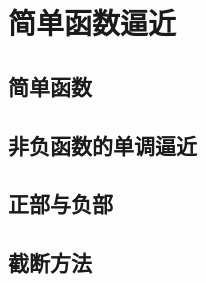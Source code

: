 \section{简单函数逼近}
\label{b1:sec:0403}


\subsection{简单函数}
\label{b1:subsec:040301}

\subsection{非负函数的单调逼近}
\label{b1:subsec:040302}

\subsection{正部与负部}
\label{b1:subsec:040303}

\subsection{截断方法}
\label{b1:subsec:040304}


